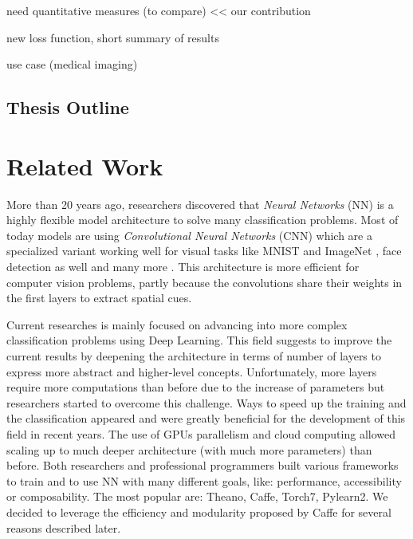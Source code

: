 \documentclass[a4paper,12pt]{report}
\begin{document}
need quantitative measures (to compare) << our contribution

new loss function, short summary of results

use case (medical imaging)

\section{Thesis Outline}


\chapter{Related Work}

More than 20 years ago, researchers discovered that {\em Neural Networks} (NN) is a highly flexible model architecture to solve many classification problems.
Most of today models are using {\em Convolutional Neural Networks} (CNN) which are a specialized variant working well for visual tasks like MNIST \cite{mnist_web} and ImageNet \cite{krizhevsky2012imagenet}, face detection as well \cite{rowley1998neural} and many more \cite{prechelt1994proben1}.
This architecture is more efficient for computer vision problems, partly because the convolutions share their weights in the first layers to extract spatial cues.

Current researches is mainly focused on advancing into more complex classification problems using Deep Learning.
This field suggests to improve the current results by deepening the architecture in terms of number of layers to express more abstract and higher-level concepts.
Unfortunately, more layers require more computations than before due to the increase of parameters but researchers started to overcome this challenge.
Ways to speed up the training and the classification appeared and were greatly beneficial for the development of this field in recent years\cite{ciresan2011flexible}\cite{schmidhuber2015deep}\cite{nasse2009face}.
The use of GPUs parallelism and cloud computing allowed scaling up to much deeper architecture (with much more parameters) than before\cite{coates2013deep}.
Both researchers and professional programmers built various frameworks to train and to use NN with many different goals, like: performance, accessibility or composability.
The most popular are: Theano\cite{bastien2012theano}, Caffe\cite{jia2014caffe}, Torch7\cite{collobert2011torch7}, Pylearn2\cite{goodfellow2013pylearn2}.
We decided to leverage the efficiency and modularity proposed by Caffe for several reasons described later.
\end{document}
